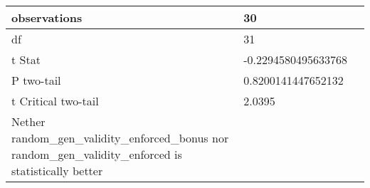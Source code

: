 \documentclass[11pt]{article}
\begin{document}
\begin{table}[]
{\begin{tabular}{|l|l|l|}
    observations                                                                                              & 30                              &                                        \\ \hline
    df                                                                                                        & 31                              &                                        \\ \hline
    t Stat                                                                                                    & -0.2294580495633768             &                                        \\ \hline
    P two-tail                                                                                                & 0.8200141447652132              &                                        \\ \hline
    t Critical two-tail                                                                                       & 2.0395                          &                                        \\ \hline
    Nether random\_gen\_validity\_enforced\_bonus nor random\_gen\_validity\_enforced is statistically better &                                 &                                        \\ \hline
    \end{tabular}%
    }
\end{table}
\end{document}
